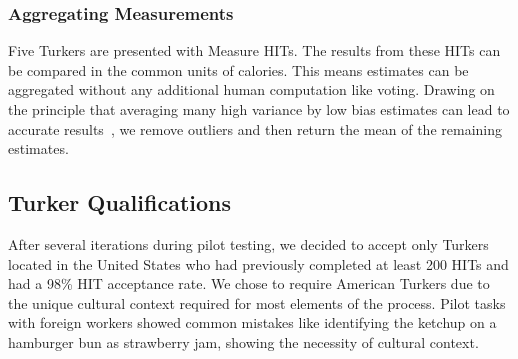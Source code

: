 \subsubsection{Aggregating Measurements} 
Five Turkers are presented with Measure HITs.  The results from these
HITs can be compared in the common units of calories. This means
estimates can be aggregated without any additional human computation
like voting. Drawing on the principle that averaging many high
variance by low bias estimates can lead to accurate
results~\cite{wisdom}, %
we remove outliers and then return the mean
of the remaining estimates.


\subsection{Turker Qualifications}
After several iterations during pilot testing, we decided to accept
only Turkers located in the United States who had previously completed
at least 200 HITs and had a 98\% HIT acceptance rate.  We chose to
require American Turkers due to the unique cultural context required
for most elements of the process.  Pilot tasks with foreign workers
showed common mistakes like identifying the ketchup on a hamburger bun
as strawberry jam, showing the necessity of cultural context.%
